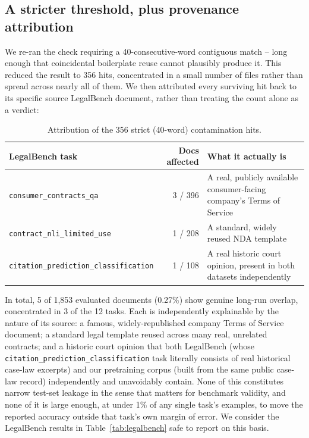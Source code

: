 \documentclass[11pt]{article}
\begin{document}
\subsection{A stricter threshold, plus provenance attribution}

We re-ran the check requiring a 40-consecutive-word contiguous match --
long enough that coincidental boilerplate reuse cannot plausibly produce
it. This reduced the result to 356 hits, concentrated in a small number
of files rather than spread across nearly all of them. We then attributed
every surviving hit back to its specific source LegalBench document,
rather than treating the count alone as a verdict:

\begin{table}[h]
\centering
\caption{Attribution of the 356 strict (40-word) contamination hits.}
\label{tab:contam}
\begin{tabularx}{\textwidth}{l r X}
\toprule
\textbf{LegalBench task} & \textbf{Docs affected} & \textbf{What it actually is} \\
\midrule
\texttt{consumer\_contracts\_qa} & 3 / 396 & A real, publicly available consumer-facing company's Terms of Service \\
\texttt{contract\_nli\_limited\_use} & 1 / 208 & A standard, widely reused NDA template \\
\texttt{citation\_prediction\_classification} & 1 / 108 & A real historic court opinion, present in both datasets independently \\
\bottomrule
\end{tabularx}
\end{table}

In total, 5 of 1{,}853 evaluated documents (0.27\%) show genuine
long-run overlap, concentrated in 3 of the 12 tasks. Each is independently
explainable by the nature of its source: a famous, widely-republished
company Terms of Service document; a standard legal template reused
across many real, unrelated contracts; and a historic court opinion that
both LegalBench (whose \texttt{citation\_\allowbreak prediction\_\allowbreak classification} task
literally consists of real historical case-law excerpts) and our
pretraining corpus (built from the same public case-law record)
independently and unavoidably contain. None of this constitutes narrow
test-set leakage in the sense that matters for benchmark validity, and
none of it is large enough, at under 1\% of any single task's examples,
to move the reported accuracy outside that task's own margin of error.
We consider the LegalBench results in Table~\ref{tab:legalbench} safe to
report on this basis.
\end{document}
